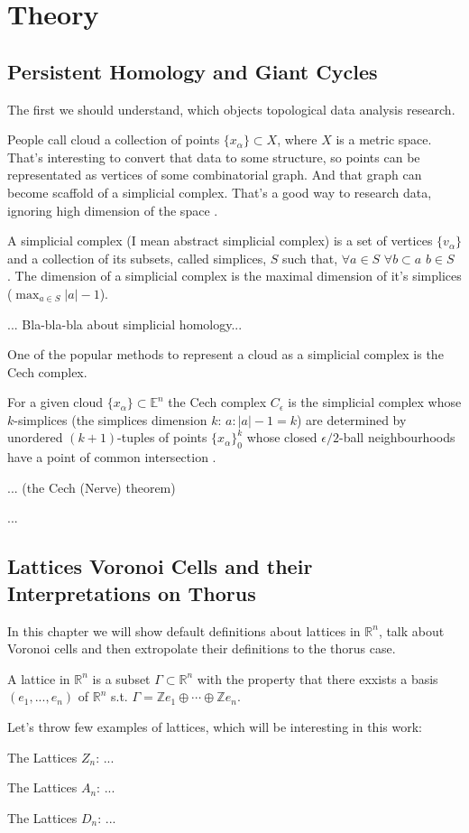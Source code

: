 \documentclass[a4paper, 12pt]{article}
\begin{document}
\section{Theory}
\subsection{Persistent Homology and Giant Cycles}
\par The first we should understand, which objects topological data analysis research.
\par People call cloud a collection of points $\{x_\alpha\} \subset X$, where $X$ is a metric space. That's interesting to convert that data to some structure, so points can be representated as vertices of some combinatorial graph. And that graph can become scaffold of a simplicial complex. That's a good way to research data, ignoring high dimension of the space \cite{ghrist}.
\par A simplicial complex  (I mean abstract simplicial complex) is a set of vertices $\{v_\alpha\}$ and a collection of its subsets, called simplices, $S$ such that, $\forall a\in S$ $\forall b\subset a$ $b\in S$ \cite{prasolov}. The dimension of a simplicial complex is the maximal dimension of it's simplices ($\max_{a\in S}|a| - 1$).
\par ... Bla-bla-bla about simplicial homology...
\par One of the popular methods to represent a cloud as a simplicial complex is the Cech complex.
\par For a given cloud $\{x_\alpha\}\subset\mathbb{E}^n$ the Cech complex $C_\epsilon$ is the simplicial complex whose $k$-simplices (the simplices dimension $k$: $a: |a|-1 = k$) are determined by unordered $(k+1)$-tuples of points $\{x_\alpha\}_0^k$ whose closed $\epsilon/2$-ball neighbourhoods have a point of common intersection \cite{ghrist}.
\par ... (the Cech (Nerve) theorem) 
\par ...




\subsection{Lattices Voronoi Cells and their Interpretations on Thorus}
\par In this chapter we will show default definitions about lattices in $\mathbb{R}^n$, talk about Voronoi cells and then extropolate their definitions to the thorus case. 
\par A lattice in $\mathbb{R}^n$ is a subset $\Gamma\subset\mathbb{R}^n$ with the property that there exxists a basis $(e_1, ..., e_n)$ of $\mathbb{R}^n$ s.t. $\Gamma = \mathbb{Z}e_1 \oplus\cdots\oplus \mathbb{Z}e_n$. \cite{ebeling}
\par Let's throw few examples of lattices, which will be interesting in this work:
\par The Lattices $Z_n$: ...
\par The Lattices $A_n$: ...
\par The Lattices $D_n$: ...
\end{document}
